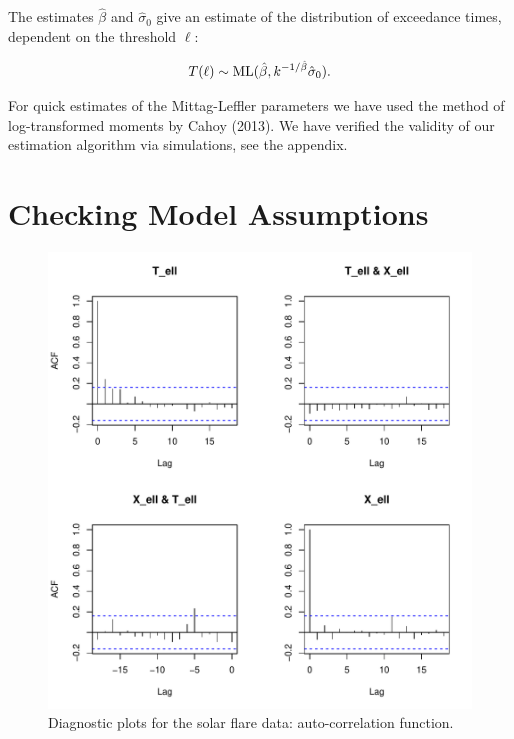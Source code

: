 \documentclass[smallextended]{svjour3}       %
\begin{document}
The estimates \(\hat \beta\) and \(\hat \sigma_0\) give an estimate of
the distribution of exceedance times, dependent on the threshold
\(\ell\):

\begin{align*}
T(\ell) \sim {\rm ML}(\hat \beta, k^{-1/\hat \beta} \hat \sigma_0).
\end{align*}

For quick estimates of the Mittag-Leffler parameters we have used the
method of log-transformed moments by Cahoy (2013). We have verified the
validity of our estimation algorithm via simulations, see the appendix.

\section{Checking Model Assumptions}\label{checking-model-assumptions}

\begin{figure}
\includegraphics[width=\textwidth]{article_springer_files/figure-latex/flare-diagnostics-1-1} \caption{Diagnostic plots for the solar flare data: auto-correlation function.\label{fig:flare-diagnostics-1}}\label{fig:flare-diagnostics-1}
\end{figure}
\end{document}
